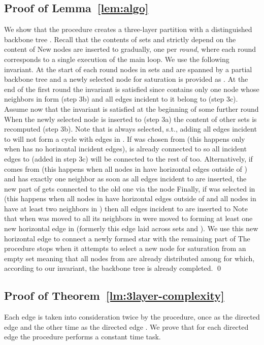 \documentclass[11pt,envcountsame,oribibl]{llncs}
\begin{document}
\subsection{Proof of Lemma~\ref{lem:algo}}
We show that the procedure creates a three-layer partition with a
distinguished backbone tree .
Recall that the contents of sets  and  strictly depend on the content of 
New nodes are inserted to  gradually, one per {\sl round}, where each round
corresponds to a single execution of the main loop. We use the following
invariant. At the start of each round nodes in sets  and  are spanned by a partial
backbone tree  and a newly selected node for saturation is provided as . At the end
of the first round the invariant is satisfied since  contains only one node whose
neighbors in  form  (step 3b) and all edges incident to it belong to  (step 3c).
Assume now that
the invariant is satisfied at the beginning of some further round  When the newly
selected node  is inserted to  (step 3a) the content of other sets is recomputed
(step 3b). Note that  is always selected, s.t., adding all edges incident to  will
not form a cycle with edges in .
If  was chosen from  (this happens only
when  has no horizontal incident edges),  is already connected to  so all
incident edges to  (added in step 3c) will be connected to the rest of  too.
Alternatively, if  comes from  (this happens when all nodes in  have
horizontal edges outside of ) and  has exactly one neighbor 
as soon as all edges incident to  are inserted,
the new part of  gets connected to the old one via the node 
Finally, if  was selected in  (this happens when all nodes in  have
horizontal edges outside of  and all nodes in  have at
least two neighbors in ) then all edges incident to  are inserted to 
Note that when  was moved to  all its neighbors in  were
moved to  forming at least one new horizontal edge in  (formerly this edge
laid across sets  and ). We use this new horizontal edge to connect a newly
formed star with the remaining part of 
The procedure stops when it attempts to select a new node for saturation from an empty
set  meaning that all nodes from  are already distributed among  for which,
according to our invariant, the backbone tree  is already completed. \qed



\subsection{Proof of Theorem~\ref{lm:3layer-complexity}}
Each edge  is taken into consideration twice by the procedure, once
as the directed edge  and the other time as the directed edge . We prove
that for each directed edge the procedure performs a constant time task.
\end{document}
